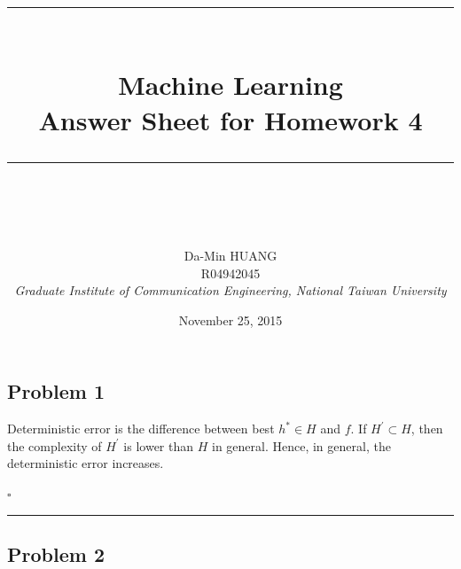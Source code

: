 \documentclass[12pt]{article}
\newcommand*{\QEDB}{\hfill\ensuremath{\square}}
\newcommand{\horrule}[1]{\rule{\linewidth}{#1}}
\begin{document}
\baselineskip 6.5mm
\setlength{\parindent}{0pt}
\title{ 
\normalfont \normalsize 
\horrule{0.5pt} \\[0.4cm]
\huge { \Huge Machine Learning \\ \large Answer Sheet for Homework 4 }\\ %
\horrule{2pt} \\ [0.5cm]
}
\author{ { \Large Da-Min HUANG } \\
{\small R04942045} \\
{\small\textit{Graduate Institute of Communication Engineering, National Taiwan University}}
}
\date{November 25, 2015}
\maketitle

\subsection*{Problem 1}

Deterministic error is the difference between best $h^* \in H$ and $f$. If $H^\prime\subset H$, then the complexity of $H^\prime$ is lower than $H$ in general. Hence, in general, the deterministic error increases.

\QEDB

\horrule{0.5pt}

\subsection*{Problem 2}
\end{document}
